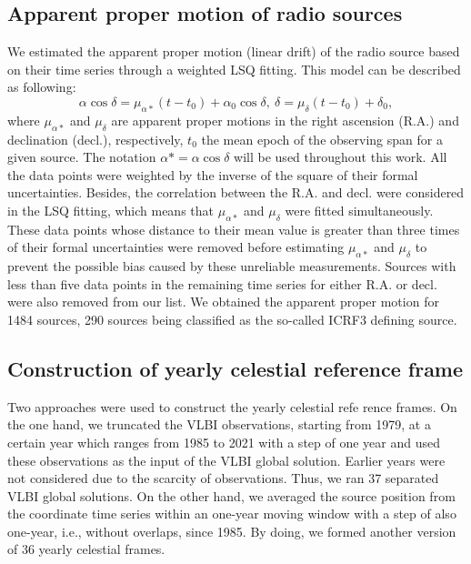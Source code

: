 \documentclass{aa}
\begin{document}

\subsection{Apparent proper motion of radio sources}  \label{subsec:apm-data}

   We estimated the apparent proper motion (linear drift) of the radio source based on their time series through a weighted LSQ fitting.
   This model can be described as following:
   \begin{equation} \label{eq:apm}
      \alpha\cos\delta = \mu_{\alpha*} (t-t_0) + \alpha_0\cos\delta,\ \delta = \mu_\delta (t-t_0) + \delta_0, 
   \end{equation}
   where $\mu_{\alpha*}$ and $\mu_\delta$ are apparent proper motions in the right ascension (R.A.) and declination (decl.), respectively, $t_0$ the mean epoch of the observing span for a given source.
   The notation $\alpha*=\alpha\cos\delta$ will be used throughout this work.
   All the data points were weighted by the inverse of the square of their formal uncertainties.
   Besides, the correlation between the R.A. and decl. were considered in the LSQ fitting, which means that $\mu_{\alpha*}$ and $\mu_\delta$ were fitted simultaneously.
   These data points whose distance to their mean value is greater than three times of their formal uncertainties were removed before estimating $\mu_{\alpha*}$ and $\mu_\delta$ to prevent the possible bias caused by these unreliable measurements.
   Sources with less than five data points in the remaining time series for either R.A. or decl. were also removed from our list.
   We obtained the apparent proper motion for 1484 sources, 290 sources being classified as the so-called ICRF3 defining source.
    

\subsection{Construction of yearly celestial reference frame}  \label{subsec:yearly-crf}

    Two approaches were used to construct the yearly celestial refe rence frames.
    On the one hand, we truncated the VLBI observations, starting from 1979, at a certain year which ranges from 1985 to 2021 with a step of one year and used these observations as the input of the VLBI global solution.
    Earlier years were not considered due to the scarcity of observations.
    Thus, we ran 37 separated VLBI global solutions.
    On the other hand, we averaged the source position from the coordinate time series within an one-year moving window with a step of also one-year, i.e., without overlaps, since 1985.
    By doing, we formed another version of 36 yearly celestial frames.
\end{document}
